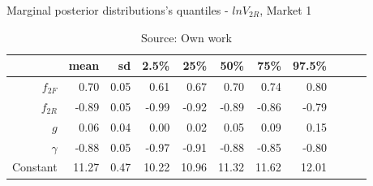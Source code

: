 \begin{table}[H]
\caption{Marginal posterior distributions's quantiles - $ln V_{2R}$,  Market 1}
\centering
\begin{tabular}{rrrrrrrrrrr}
  \toprule
          & mean  & sd   & 2.5\% & 25\%  & 50\%  & 75\%  & 97.5\%\\
 \hline

$f_{2F}$  & 0.70  & 0.05 & 0.61  & 0.67  & 0.70  & 0.74  & 0.80  \\ 
$f_{2R}$  & -0.89 & 0.05 & -0.99 & -0.92 & -0.89 & -0.86 & -0.79 \\ 
$g$       & 0.06  & 0.04 & 0.00  & 0.02  & 0.05  & 0.09  & 0.15  \\ 
$\gamma$  & -0.88 & 0.05 & -0.97 & -0.91 & -0.88 & -0.85 & -0.80 \\ 
Constant  & 11.27 & 0.47 & 10.22 & 10.96 & 11.32 & 11.62 & 12.01 \\ 
     \bottomrule
\end{tabular}
\caption*{Source: Own work}
\end{table}
